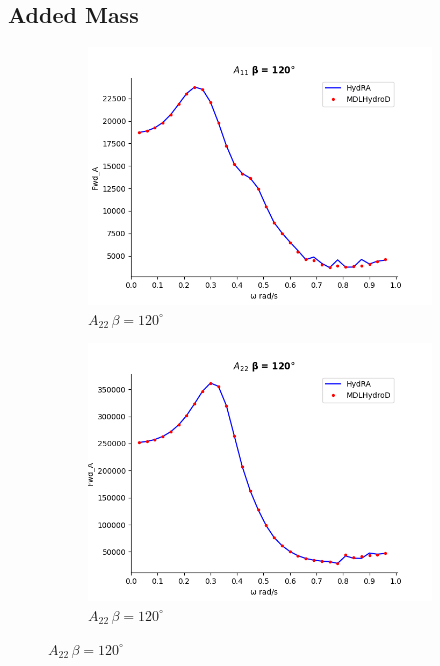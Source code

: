 \subsection{Added Mass}
\begin{figure}[H]
    \centering
    \begin{subfigure}[b]{0.45\textwidth}
        \includegraphics[width=\textwidth]{plots/kvlcc/added_mass/a11.png}
        \caption{$A_{22} \, \beta = 120^{\circ}$}
    \end{subfigure}
    \begin{subfigure}[b]{0.45\textwidth}
        \includegraphics[width=\textwidth]{plots/kvlcc/added_mass/a22.png}
        \caption{$A_{22} \, \beta = 120^{\circ}$}
    \end{subfigure}

\end{figure}
